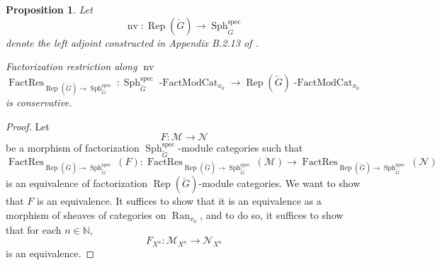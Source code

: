 \documentclass[10pt]{amsart}
\newtheorem{prop}[subsubsection]{Proposition}
\theoremstyle{remark}
\newcommand{\on}[1]{\operatorname{#1}}
\newcommand{\Gcheck}{\check{G}}
\newcommand{\Ran}{\on{Ran}}
\begin{document}
\begin{prop}
    Let
    $$
    \on{nv} : \on{Rep}(\Gcheck) \longrightarrow \on{Sph}_{\Gcheck}^{\on{spec}}
    $$
    denote the left adjoint constructed in Appendix B.2.13 of \cite{GLC2}. 
    
    Factorization restriction along $\on{nv}$
    $$
    \on{FactRes}_{\on{Rep}(\Gcheck) \to \on{Sph}_{\Gcheck}^{\on{spec}}} : \on{Sph}_{\Gcheck}^{\on{spec}} \on{-FactModCat}_{x_0} \longrightarrow \on{Rep}(\Gcheck) \on{-FactModCat}_{x_0}
    $$
    is conservative.
\end{prop}
\begin{proof}
    Let 
    $$
    F : \mathcal{M} \longrightarrow \mathcal{N}
    $$
    be a morphism of factorization $\on{Sph}_{\Gcheck}^{\on{spec}}$-module categories such that 
    $$
    \on{FactRes}_{\on{Rep}(\Gcheck) \to \on{Sph}_{\Gcheck}^{\on{spec}}}(F) : \on{FactRes}_{\on{Rep}(\Gcheck) \to \on{Sph}_{\Gcheck}^{\on{spec}}}(\mathcal{M}) \longrightarrow \on{FactRes}_{\on{Rep}(\Gcheck) \to \on{Sph}_{\Gcheck}^{\on{spec}}} (\mathcal{N})
    $$
    is an equivalence of factorization $\on{Rep}(\Gcheck)$-module categories.
    We want to show that $F$ is an equivalence. It suffices to show that it is an equivalence as a morphism of sheaves of categories on $\Ran_{x_0}$, and to do so, it suffices to show that for each $n \in \mathbb{N}$,
    $$
    F_{X^n} : \mathcal{M}_{X^n} \longrightarrow \mathcal{N}_{X^n}
    $$
    is an equivalence.
    

\end{proof}
\end{document}
